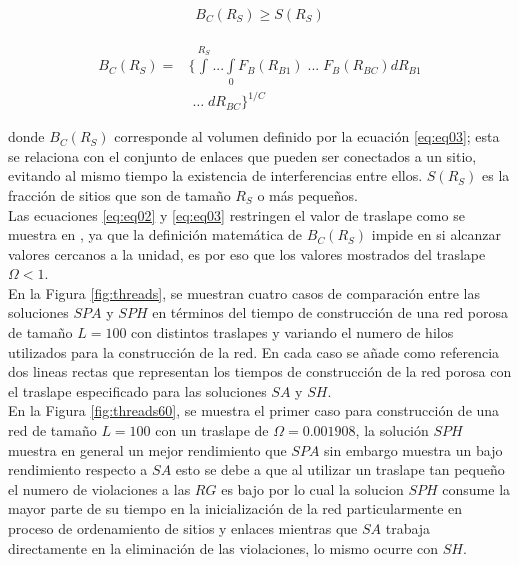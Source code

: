 \begin{equation}
B_C(R_S) \geq S(R_S)
\label{eq:eq02}
\end{equation}

\begin{eqnarray}
\nonumber \\
B_C(R_S) = & \{\int\limits^{R_S} ... \int\limits_{0} F_B(R_{B1})\; ... \; F_B(R_{BC})dR_{B1} \nonumber \\
& \; \ldots \; dR_{BC} \}^{1/C}
\label{eq:eq03}
\end{eqnarray}

donde $B_C(R_S)$ corresponde al volumen definido por la ecuación \ref{eq:eq03}; esta se relaciona con el conjunto de enlaces que pueden ser conectados a un sitio, evitando al mismo tiempo la existencia de interferencias entre ellos. $S(R_S)$ es la fracción de sitios que son de tamaño $R_S$ o más pequeños.\\

Las ecuaciones \ref{eq:eq02} y \ref{eq:eq03} restringen el valor de traslape como se muestra en \cite{ref5}, ya que la definición matemática de $B_C(R_S)$ impide en si alcanzar valores cercanos a la unidad, es por eso que los valores mostrados del traslape $\Omega<1$.\\

En la Figura \ref{fig:threads}, se muestran cuatro casos de comparación entre las soluciones $SPA$ y $SPH$ en términos del tiempo de construcción de una red porosa de tamaño $L=100$ con distintos traslapes y variando el numero de hilos utilizados para la construcción de la red. En cada caso se añade como referencia dos lineas rectas que representan los tiempos de construcción de la red porosa con el traslape especificado para las soluciones $SA$ y $SH$.\\

En la Figura \ref{fig:threads60}, se muestra el primer caso para construcción de una red de tamaño $L=100$ con un  traslape de $\Omega=0.001908$, la solución $SPH$ muestra en general un mejor rendimiento que $SPA$ sin embargo muestra un bajo rendimiento respecto a $SA$ esto se debe a que al utilizar un traslape tan pequeño el numero de violaciones a las $RG$ es bajo por lo cual la solucion $SPH$ consume la mayor parte de su tiempo en la inicialización de la red particularmente en proceso de ordenamiento de sitios y enlaces mientras que $SA$ trabaja directamente en la eliminación de las violaciones, lo mismo ocurre con $SH$.\\

